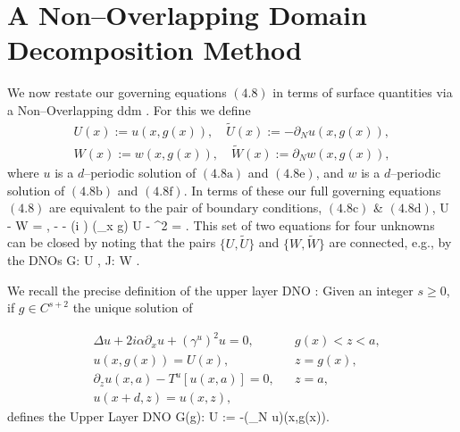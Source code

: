 \section{A Non--Overlapping Domain Decomposition Method}
\label{Sec:DDM}

We now restate our governing equations $(4.8)$ in terms
 of surface quantities via a Non--Overlapping \gls{ddm} \cite{Lions90,DespresPhD,Despres91}. For this we define
\begin{gather*}
U(x) := u(x,g(x)),
\quad
\tilde{U}(x) := -\partial_N u(x,g(x)),
\\
W(x) := w(x,g(x)),
\quad
\tilde{W}(x) := \partial_N w(x,g(x)),
\end{gather*}
where $u$ is a $d$--periodic solution of $(4.8\text{a})$ and
$(4.8\text{e})$, and $w$ is a $d$--periodic solution of
$(4.8\text{b})$ and $(4.8\text{f})$. In terms of these
our full governing equations $(4.8)$ are equivalent to the
pair of boundary conditions, $(4.8\text{c})$ \&
$(4.8\text{d})$,
\be
U - W = \zeta,
\quad
- - (i \alpha) (\partial_x g) U 
  - \tau^2 
  = \psi.
\ee
This set of two equations for four unknowns can be closed by noting that
the pairs $\{ U, \tilde{U} \}$ and $\{ W, \tilde{W} \}$ are connected,
e.g., by the DNOs
\bes
G: U \rightarrow {},
\quad
J: W \rightarrow {}.
\ees
\begin{definition} We recall the precise definition of the upper layer DNO
\cite{Nicholls16b}:
Given an integer $s \geq 0$, if 
$g \in C^{s+2}$ the unique solution of

\begin{subequations}
\label{Eqn:Helm:Upper}
\begin{align}
& \Delta u + 2 i \alpha \partial_x u + (\gamma^u)^2 u = 0,
  && g(x) < z < a, \\
& u(x,g(x)) = U(x), 
  && z = g(x), \\
& \partial_z u(x,a) - T^u[ u(x,a) ] = 0,
  && z = a, \\
& u(x+d,z)=u(x,z),
\end{align}
\end{subequations}
defines the Upper Layer DNO
\be
\label{Eqn:G}
G(g): U \rightarrow {} := -(\partial_N u)(x,g(x)).
\ee
\end{definition}


